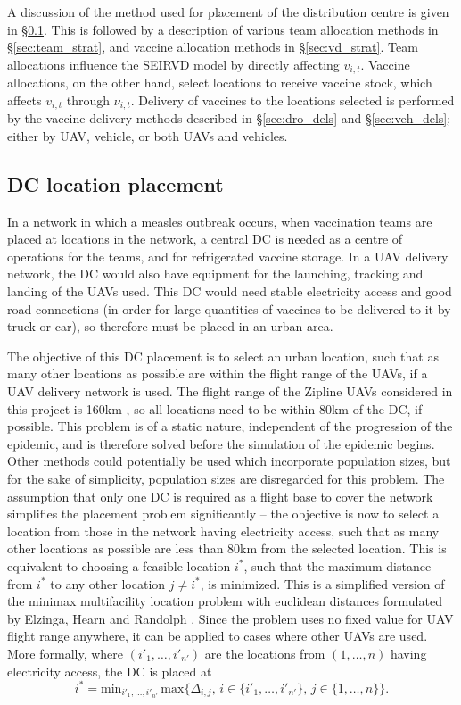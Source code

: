 A discussion of the method used for placement of the distribution centre is given in \S \ref{sec:res_DCloc}. 
This is followed by a description of various team allocation methods in \S \ref{sec:team_strat}, and vaccine allocation methods in \S \ref{sec:vd_strat}. Team allocations influence the SEIRVD model by directly affecting $v_{i,t}$. Vaccine allocations, on the other hand, select locations to receive vaccine stock, which affects $v_{i,t}$ through $\nu_{i,t}$. Delivery of vaccines to the locations selected is performed by the vaccine delivery methods described in \S \ref{sec:dro_dels} and \S \ref{sec:veh_dels}; either by UAV, vehicle, or both UAVs and vehicles.

\subsection{DC location placement} 
\label{sec:res_DCloc}
In a network in which a measles outbreak occurs, when vaccination teams are placed at locations in the network, a central DC is needed as a centre of operations for the teams, and for refrigerated vaccine storage. In a UAV delivery network, the DC would also have equipment for the launching, tracking and landing of the UAVs used. This DC would need stable electricity access and good road connections (in order for large quantities of vaccines to be delivered to it by truck or car), so therefore must be placed in an urban area.

The objective of this DC placement is to select an urban location, such that as many other locations as possible are within the flight range of the UAVs, if a UAV delivery network is used. The flight range of the Zipline UAVs considered in this project is 160km \cite{czerwonka_2018,service_contract_2018,zipline_impact}, so all locations need to be within 80km of the DC, if possible. This problem is of a static nature, independent of the progression of the epidemic, and is therefore solved before the simulation of the epidemic begins. Other methods could potentially be used which incorporate population sizes, but for the sake of simplicity, population sizes are disregarded for this problem. The assumption that only one DC is required as a flight base to cover the network simplifies the placement problem significantly -- the objective is now to select a location from those in the network having electricity access, such that as many other locations as possible are less than 80km from the selected location. 
This is equivalent to choosing a feasible location $i^{*}$, such that the maximum distance from $i^{*}$ to any other location $j \neq i^{*}$, is minimized. This is a simplified version of the minimax multifacility location problem with euclidean distances formulated by Elzinga, Hearn and Randolph \cite{elzinga_1976}. Since the problem uses no fixed value for UAV flight range anywhere, it can be applied to cases where other UAVs are used.
More formally, where $(i'_{1},\ldots,i'_{n'})$ are the locations from $(1,\dots,n)$ having electricity access, the DC is placed at
$$i^{*} = \text{min}_{i'_{1},\ldots,i'_{n'}} \, \text{max} \{\Delta_{i,j}, \, i \in \{i'_{1},\ldots,i'_{n'}\}, \, j \in \{1,\ldots,n\}\}.$$

